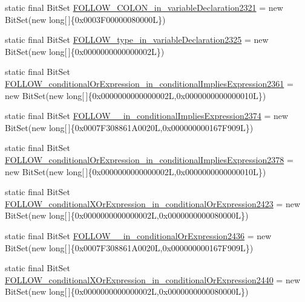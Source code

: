 \begin{DoxyCompactItemize}
\item 
static final Bit\-Set \hyperlink{classorg_1_1tzi_1_1use_1_1parser_1_1soil_1_1_soil_parser_a651f24aaa4de972ce7ca09827bb55a64}{F\-O\-L\-L\-O\-W\-\_\-\-C\-O\-L\-O\-N\-\_\-in\-\_\-variable\-Declaration2321} = new Bit\-Set(new long\mbox{[}$\,$\mbox{]}\{0x0003\-F00000080000\-L\})
\item 
static final Bit\-Set \hyperlink{classorg_1_1tzi_1_1use_1_1parser_1_1soil_1_1_soil_parser_a9e8653548d2741bfa83a9c192a092a93}{F\-O\-L\-L\-O\-W\-\_\-type\-\_\-in\-\_\-variable\-Declaration2325} = new Bit\-Set(new long\mbox{[}$\,$\mbox{]}\{0x0000000000000002\-L\})
\item 
static final Bit\-Set \hyperlink{classorg_1_1tzi_1_1use_1_1parser_1_1soil_1_1_soil_parser_a5a8b54ce4940eb4068ec9df9f4fc6f41}{F\-O\-L\-L\-O\-W\-\_\-conditional\-Or\-Expression\-\_\-in\-\_\-conditional\-Implies\-Expression2361} = new Bit\-Set(new long\mbox{[}$\,$\mbox{]}\{0x0000000000000002\-L,0x0000000000000010\-L\})
\item 
static final Bit\-Set \hyperlink{classorg_1_1tzi_1_1use_1_1parser_1_1soil_1_1_soil_parser_a03b4d2859b4826d8199591b1d6c89249}{F\-O\-L\-L\-O\-W\-\_\-\_\-in\-\_\-conditional\-Implies\-Expression2374} = new Bit\-Set(new long\mbox{[}$\,$\mbox{]}\{0x0007\-F308861\-A0020\-L,0x000000000167\-F909\-L\})
\item 
static final Bit\-Set \hyperlink{classorg_1_1tzi_1_1use_1_1parser_1_1soil_1_1_soil_parser_ae7d66c2d318750db352a2865ca8b836b}{F\-O\-L\-L\-O\-W\-\_\-conditional\-Or\-Expression\-\_\-in\-\_\-conditional\-Implies\-Expression2378} = new Bit\-Set(new long\mbox{[}$\,$\mbox{]}\{0x0000000000000002\-L,0x0000000000000010\-L\})
\item 
static final Bit\-Set \hyperlink{classorg_1_1tzi_1_1use_1_1parser_1_1soil_1_1_soil_parser_a39dedf6b603cc1b5e69d54103fbde33a}{F\-O\-L\-L\-O\-W\-\_\-conditional\-X\-Or\-Expression\-\_\-in\-\_\-conditional\-Or\-Expression2423} = new Bit\-Set(new long\mbox{[}$\,$\mbox{]}\{0x0000000000000002\-L,0x0000000000080000\-L\})
\item 
static final Bit\-Set \hyperlink{classorg_1_1tzi_1_1use_1_1parser_1_1soil_1_1_soil_parser_ab103b9f1f4a80ad034be8152771e9226}{F\-O\-L\-L\-O\-W\-\_\-\_\-in\-\_\-conditional\-Or\-Expression2436} = new Bit\-Set(new long\mbox{[}$\,$\mbox{]}\{0x0007\-F308861\-A0020\-L,0x000000000167\-F909\-L\})
\item 
static final Bit\-Set \hyperlink{classorg_1_1tzi_1_1use_1_1parser_1_1soil_1_1_soil_parser_a1275cf467b079c9a5adc91db9ee1dd8b}{F\-O\-L\-L\-O\-W\-\_\-conditional\-X\-Or\-Expression\-\_\-in\-\_\-conditional\-Or\-Expression2440} = new Bit\-Set(new long\mbox{[}$\,$\mbox{]}\{0x0000000000000002\-L,0x0000000000080000\-L\})

\end{DoxyCompactItemize}
